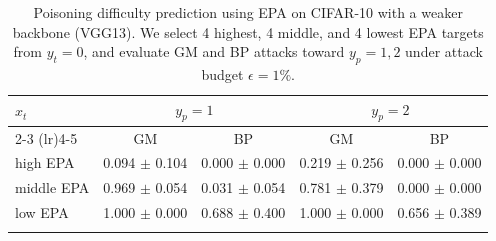 \begin{table}[t]
\centering
\begin{tabular}{lcccc}
\toprule
$x_t$ & \multicolumn{2}{c}{$y_p=1$} & \multicolumn{2}{c}{$y_p=2$} \\
\cmidrule(lr){2-3} \cmidrule(lr){4-5}
 & GM & BP & GM & BP \\
\midrule
high EPA & 0.094 $\pm$ 0.104 & 0.000 $\pm$ 0.000 & 0.219 $\pm$ 0.256 & 0.000 $\pm$ 0.000 \\
middle EPA & 0.969 $\pm$ 0.054 & 0.031 $\pm$ 0.054 & 0.781 $\pm$ 0.379 & 0.000 $\pm$ 0.000 \\
low EPA & 1.000 $\pm$ 0.000 & 0.688 $\pm$ 0.400 & 1.000 $\pm$ 0.000 & 0.656 $\pm$ 0.389 \\
\bottomrule
\caption{Poisoning difficulty prediction using EPA on CIFAR-10 with a weaker backbone (VGG13). We select 4 highest, 4 middle, and 4 lowest EPA targets from $y_t=0$, and evaluate GM and BP attacks toward $y_p=1,2$ under attack budget $\epsilon=1\%$.}
\label{tab:cifar10_epa_vgg13}
\end{tabular}
\end{table}
